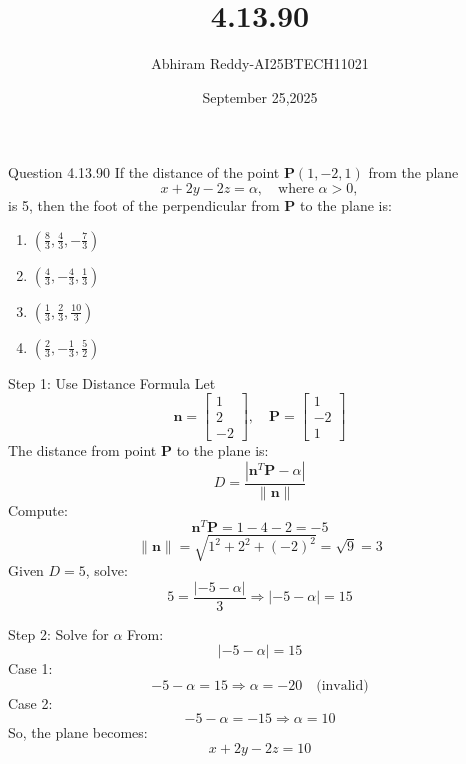 \documentclass{beamer}
\title 
{4.13.90}
\date{September 25,2025}
\author 
{Abhiram Reddy-AI25BTECH11021}
\begin{document}
\frame{\titlepage}

\begin{frame}{Question 4.13.90}
If the distance of the point \( \mathbf{P}(1, -2, 1) \) from the plane 
\[
x + 2y - 2z = \alpha, \quad \text{where } \alpha > 0,
\]
is 5, then the foot of the perpendicular from \( \mathbf{P} \) to the plane is:

\begin{multicols}{4}
\begin{enumerate}
    \item \( \left( \frac{8}{3}, \frac{4}{3}, -\frac{7}{3} \right) \)
    \item \( \left( \frac{4}{3}, -\frac{4}{3}, \frac{1}{3} \right) \)
    \item \( \left( \frac{1}{3}, \frac{2}{3}, \frac{10}{3} \right) \)
    \item \( \left( \frac{2}{3}, -\frac{1}{3}, \frac{5}{2} \right) \)
\end{enumerate}
\end{multicols}
\end{frame}

\begin{frame}{Step 1: Use Distance Formula}
Let
\[
\mathbf{n} = \begin{bmatrix} 1 \\ 2 \\ -2 \end{bmatrix}, \quad \mathbf{P} = \begin{bmatrix} 1 \\ -2 \\ 1 \end{bmatrix}
\]
The distance from point \( \mathbf{P} \) to the plane is:
\begin{equation}
D = \frac{|\mathbf{n}^T \mathbf{P} - \alpha|}{\|\mathbf{n}\|}
\end{equation}
Compute:
\begin{equation}
\mathbf{n}^T \mathbf{P} = 1 - 4 - 2 = -5
\end{equation}
\begin{equation}
\|\mathbf{n}\| = \sqrt{1^2 + 2^2 + (-2)^2} = \sqrt{9} = 3
\end{equation}
Given \( D = 5 \), solve:
\begin{equation}
5 = \frac{|-5 - \alpha|}{3} \Rightarrow |-5 - \alpha| = 15
\end{equation}
\end{frame}

\begin{frame}{Step 2: Solve for \(\alpha\)}
From:
\[
|-5 - \alpha| = 15
\]
Case 1:
\begin{equation}
-5 - \alpha = 15 \Rightarrow \alpha = -20 \quad \text{(invalid)}
\end{equation}
Case 2:
\begin{equation}
-5 - \alpha = -15 \Rightarrow \alpha = 10
\end{equation}
So, the plane becomes:
\begin{equation}
x + 2y - 2z = 10
\end{equation}
\end{frame}
\end{document}
